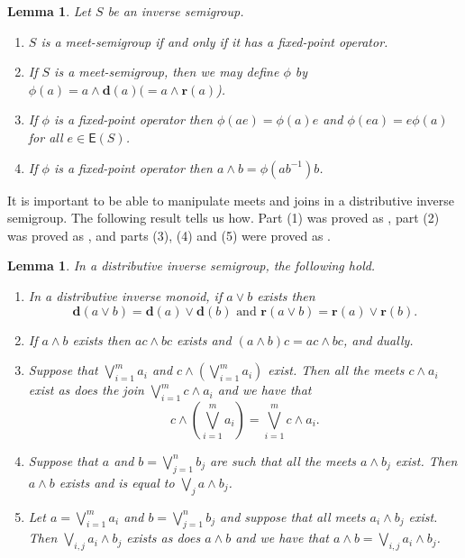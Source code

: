 \documentclass[a4paper]{amsart}
\newtheorem{lemma}[theorem]{Lemma}
\begin{document}
\begin{lemma}\label{lem:meets}
Let $S$ be an inverse semigroup.
\begin{enumerate}
\item $S$ is a meet-semigroup if and only if it has a fixed-point operator.
\item If $S$ is a meet-semigroup, then we may define $\phi$ by $\phi (a) = a \wedge \mathbf{d}(a) (= a \wedge \mathbf{r}(a)$).
\item If $\phi$ is a fixed-point operator then $\phi (ae) = \phi (a)e$ and $\phi (ea) = e \phi (a)$ for all $e \in \mathsf{E}(S)$.
\item If $\phi$ is a fixed-point operator then $a \wedge b = \phi (ab^{-1})b$.
\end{enumerate}
\end{lemma}

It is important to be able to manipulate meets and joins in a distributive inverse semigroup.
The following result tells us how.
Part (1) was proved as \cite[Proposition~1.4.17]{Lawson1998},
part (2) was proved as  \cite[Proposition 1.4.9]{Lawson1998},
and parts (3), (4) and (5) were proved as \cite[Lemma 2.5]{Lawson3}.


\begin{lemma}\label{lem:meets-joins} In a distributive inverse semigroup, the following hold.
\begin{enumerate}

\item In a distributive inverse monoid, if $a \vee b$ exists then
$$\mathbf{d}(a \vee b) = \mathbf{d}(a) \vee \mathbf{d}(b)
\mbox{ and }
\mathbf{r}(a \vee b) = \mathbf{r}(a) \vee \mathbf{r}(b).$$

\item If $a \wedge b$ exists then $ac \wedge bc$ exists and $(a \wedge b)c = ac \wedge bc$, and dually.

\item Suppose that $\bigvee_{i=1}^{m} a_{i}$ and $c \wedge \left( \bigvee_{i=1}^{m} a_{i} \right)$ exist.
Then all the meets $c \wedge a_{i }$ exist as does the join $\bigvee_{i=1}^{m} c \wedge a_{i}$
and we have that
$$
c \wedge \left( \bigvee_{i=1}^{m} a_{i} \right)
= 
\bigvee_{i=1}^{m} c \wedge a_{i}.
$$

\item Suppose that $a$ and $b = \bigvee_{j=1}^{n} b_{j}$ are such that  all the meets $a \wedge b_{j}$ exist.
Then $a \wedge b$ exists and is equal to $\bigvee_{j} a \wedge b_{j}$.

\item Let $a = \bigvee_{i=1}^{m} a_{i}$ and $b = \bigvee_{j=1}^{n} b_{j}$ and suppose that all meets $a_{i} \wedge b_{j}$ exist.
Then $\bigvee_{i,j} a_{i} \wedge b_{j}$ exists as does $a \wedge b$ and we have that $a \wedge b = \bigvee_{i,j} a_{i} \wedge b_{j}$.

\end{enumerate}
\end{lemma}
\end{document}
